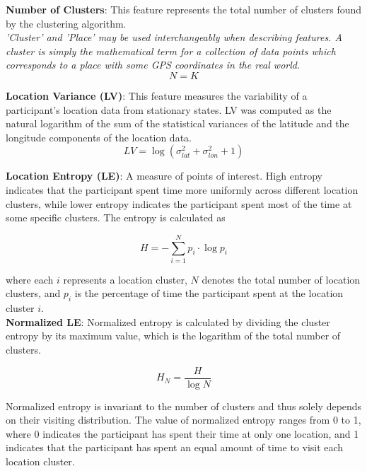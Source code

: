 \textbf{Number of Clusters}: This feature represents the total number of clusters found by the clustering algorithm.\\
\textit{'Cluster' and 'Place' may be used interchangeably when describing features. A cluster is simply the mathematical term for a collection of data points which corresponds to a place with some GPS coordinates in the real world.}\\

\begin{equation}
\label{eq:saeb-num-places}
N = K
\end{equation}

\textbf{Location Variance (LV)}: This feature measures the variability of a participant’s location data from stationary states. LV was computed as the natural logarithm of the sum of the statistical variances of the latitude and the longitude components of the location data.\\

\begin{equation}
\label{eq:saeb-loc-var}
LV = \log (\sigma^2_{lat} + \sigma^2_{lon} + 1) 
\end{equation}

\textbf{Location Entropy (LE)}: A measure of points of interest. High
entropy indicates that the participant spent time more uniformly across different location
clusters, while lower entropy indicates the participant spent most of the time at some
specific clusters. The entropy is calculated as 

\begin{equation}
\label{eq:saeb-num-places}
H = - \sum_{i=1}^N p_i \cdot \log p_i
\end{equation}

where each $i$ represents a location cluster, $N$ denotes the total number of location clusters, and $p_i$ is the percentage of time the participant spent at the location cluster $i$. \\

\textbf{Normalized LE}: Normalized entropy is calculated by dividing the cluster entropy by its maximum value, which is the logarithm of the total number of clusters. 

\begin{equation}
\label{eq:saeb-num-places}
H_N = \frac{H}{\log N}
\end{equation}

Normalized entropy is invariant to the number of clusters and thus solely depends on their visiting distribution. The value of normalized entropy ranges from 0 to 1, where 0 indicates the participant has spent their time at only one location, and 1 indicates that the participant has spent an equal amount of time to visit each location cluster.\\

